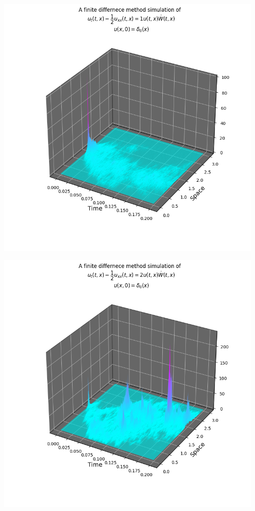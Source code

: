 \documentclass{beamer}%
\numberwithin{equation}{section}
\begin{document}
	\begin{frame}
		\centering
		\includegraphics[scale=.5]{SHEdeltaNoise1.png}
	\end{frame}
	
	\begin{frame}
		\centering
		\includegraphics[scale=.5]{SHEdeltaNoise2.png}
	\end{frame}
	
\end{document}
